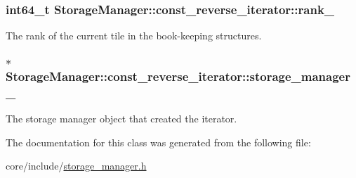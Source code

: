 \subsubsection[{rank\+\_\+}]{\setlength{\rightskip}{0pt plus 5cm}int64\+\_\+t Storage\+Manager\+::const\+\_\+reverse\+\_\+iterator\+::rank\+\_\+\hspace{0.3cm}{\ttfamily [private]}}\label{classStorageManager_1_1const__reverse__iterator_a7906ebe8820eb933528e446bc445c622}
The rank of the current tile in the book-\/keeping structures. \hypertarget{classStorageManager_1_1const__reverse__iterator_aef007cafd4083f3ec852a2debc3b411b}{}
\subsubsection[{storage\+\_\+manager\+\_\+}]{$\ast$ Storage\+Manager\+::const\+\_\+reverse\+\_\+iterator\+::storage\+\_\+manager\+\_\+\hspace{0.3cm}{\ttfamily [private]}}\label{classStorageManager_1_1const__reverse__iterator_aef007cafd4083f3ec852a2debc3b411b}
The storage manager object that created the iterator. 

The documentation for this class was generated from the following file\+:\begin{DoxyCompactItemize}
\item 
core/include/\hyperlink{storage__manager_8h}{storage\+\_\+manager.\+h}\end{DoxyCompactItemize}
